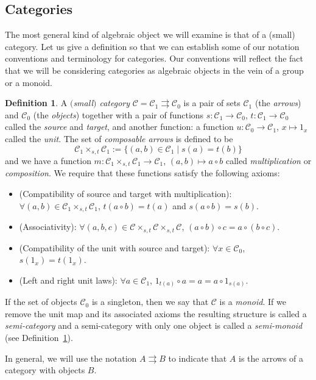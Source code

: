 \documentclass[10pt,a4paper]{amsart}
\numberwithin{equation}{section}
\theoremstyle{definition}
\newtheorem{Definition}[Theorem]{Definition}
\newcommand{\CC}{\mathcal{C}}
\newcommand{\grpd}{\rightrightarrows}
\begin{document}
\subsection{Categories}
The most general kind of algebraic object we will examine is that of a (small) category. Let us give a definition so that we can establish some of our notation conventions and terminology for categories. Our conventions will reflect the fact that we will be considering categories as algebraic objects in the vein of a group or a monoid.
\begin{Definition}\label{def:category}
  A \emph{$($small$)$ category} $ \CC = \CC_1 \grpd \CC_0 $ is a pair of sets $\CC_1 $ (the \emph{arrows}) and $\CC_0 $ (the \emph{objects}) together with a pair of functions
  $s \colon \CC_1 \to \CC_0$, $t \colon \CC_1 \to \CC_0$
  called the \emph{source} and \emph{target}, and another function:
  a function
  $u \colon \CC_0 \to \CC_1$, $x \mapsto 1_x$
  called the \emph{unit}. The set of \emph{composable arrows} is defined to be
  \[ \CC_1 \times_{s,t} \CC_1 := \{ (a,b) \in \CC_1 \mid s(a) = t(b) \} \]
  and we have a function
  $m \colon \CC_1 \times_{s,t} \CC_1 \to \CC_1$, $(a,b) \mapsto a \circ b$
  called \emph{multiplication} or \emph{composition}. We require that these functions satisfy the following axioms:
  \begin{itemize}\itemsep=0pt
    \item (Compatibility of source and target with multiplication):
    $\forall (a,b) \in \CC_1 \times_{s,t} \CC_1$, $ t( a \circ b) = t(a) $ and $ s(a \circ b ) = s(b)$.
    \item (Associativity):
    $\forall (a,b,c ) \in \CC \times_{s,t} \CC \times_{s,t} \CC$, $ (a \circ b) \circ c = a \circ (b \circ c)$.
    \item (Compatibility of the unit with source and target):
    $\forall x \in \CC_0$, $ s(1_x) = t(1_x)$.
    \item (Left and right unit laws):
   $\forall a \in \CC_1$, $ 1_{t(a)} \circ a = a  = a \circ 1_{s(a)}$.
  \end{itemize}
   If the set of objects $ \CC_0 $ is a singleton, then we say that $ \CC $ is a \emph{monoid}. If we remove the unit map and its associated axioms the resulting structure is called a \emph{semi-category} and a semi-category with only one object is called a \emph{semi-monoid} (see Definition~\ref{def:category}).
\end{Definition}
In general, we will use the notation $ A \grpd B $ to indicate that $ A$ is the arrows of a category with objects $ B $.
\end{document}
